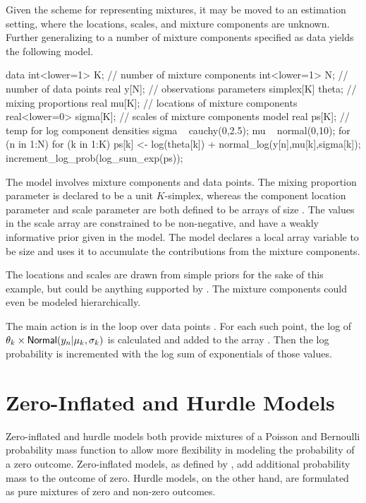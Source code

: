 Given the scheme for representing mixtures, it may be moved to an
estimation setting, where the locations, scales, and mixture
components are unknown.  Further generalizing to a number of mixture
components specified as data yields the following model.
%
\begin{stancode}
data {
  int<lower=1> K;          // number of mixture components
  int<lower=1> N;          // number of data points
  real y[N];               // observations
}
parameters {
  simplex[K] theta;        // mixing proportions
  real mu[K];              // locations of mixture components
  real<lower=0> sigma[K];  // scales of mixture components
}
model {
  real ps[K];              // temp for log component densities
  sigma ~ cauchy(0,2.5);
  mu ~ normal(0,10);
  for (n in 1:N) {
    for (k in 1:K) {
      ps[k] <- log(theta[k]) 
               + normal_log(y[n],mu[k],sigma[k]);
    }
    increment_log_prob(log_sum_exp(ps));
  }
}
\end{stancode}
%
The model involves  mixture components and  data
points. The mixing proportion parameter  is declared to be
a unit $K$-simplex, whereas the component location parameter 
and scale parameter  are both defined to be arrays of size
. The values in the scale array  are constrained
to be non-negative, and have a weakly informative prior given in the
model. The model declares a local array variable  to be size
 and uses it to accumulate the contributions from the mixture
components.

The locations and scales are drawn from simple priors for the sake of
this example, but could be anything supported by \Stan.  The mixture
components  could even be modeled hierarchically.

The main action is in the loop over data points .  For each
such point, the log of $\theta_k \times
\distro{Normal}(y_n|\mu_k,\sigma_k)$ is calculated and added to the
array .  Then the log probability is incremented with the log
sum of exponentials of those values.


\section{Zero-Inflated and Hurdle Models}\label{zero-inflated.section}

Zero-inflated and hurdle models both provide mixtures of a Poisson and
Bernoulli probability mass function to allow more flexibility in
modeling the probability of a zero outcome.  Zero-inflated models, as
defined by \citet{Lambert:1992}, add additional probability mass to
the outcome of zero.  Hurdle models, on the other hand, are formulated
as pure mixtures of zero and non-zero outcomes.  

